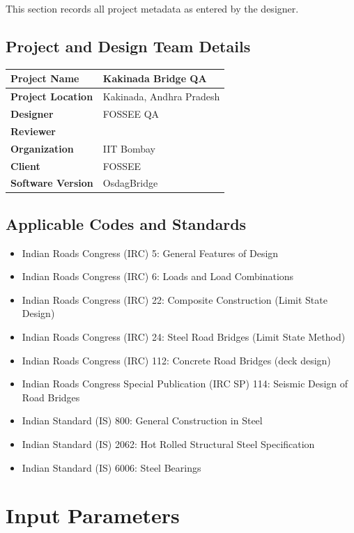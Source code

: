 \documentclass[12pt,a4paper]{report}
\numberwithin{table}{chapter}
\numberwithin{figure}{chapter}
\begin{document}
This section records all project metadata as entered by the designer.

\section{Project and Design Team Details}
\label{sec:project-details}

\begin{tabular}{|L{5.5cm}|L{8.5cm}|}
\hline
\textbf{Project Name} & Kakinada Bridge QA \\
\hline
\textbf{Project Location} & Kakinada, Andhra Pradesh \\
\hline
\textbf{Designer} & FOSSEE QA \\
\hline
\textbf{Reviewer} &  \\
\hline
\textbf{Organization} & IIT Bombay \\
\hline
\textbf{Client} & FOSSEE \\
\hline
\textbf{Software Version} & OsdagBridge \\
\hline
\end{tabular}


\section{Applicable Codes and Standards}
\label{sec:codes}

\begin{itemize}
\item Indian Roads Congress (IRC) 5: General Features of Design
\item Indian Roads Congress (IRC) 6: Loads and Load Combinations
\item Indian Roads Congress (IRC) 22: Composite Construction (Limit State Design)
\item Indian Roads Congress (IRC) 24: Steel Road Bridges (Limit State Method)
\item Indian Roads Congress (IRC) 112: Concrete Road Bridges (deck design)
\item Indian Roads Congress Special Publication (IRC SP) 114: Seismic Design of Road Bridges
\item Indian Standard (IS) 800: General Construction in Steel
\item Indian Standard (IS) 2062: Hot Rolled Structural Steel Specification
\item Indian Standard (IS) 6006: Steel Bearings
\end{itemize}


\chapter{Input Parameters}
\end{document}
